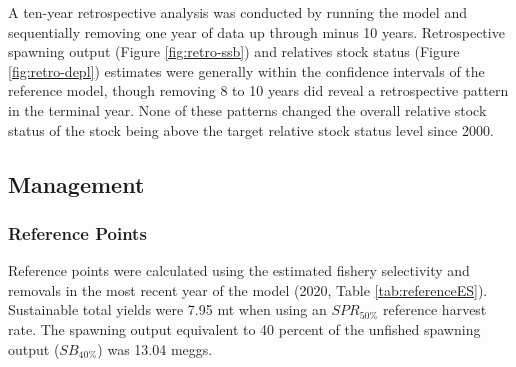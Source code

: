 \documentclass[11pt,
  english,
  a4paper,
]{article}
\begin{document}
A ten-year retrospective analysis was conducted by running the model and sequentially removing one year of data up through minus 10 years. Retrospective spawning output (Figure \ref{fig:retro-ssb}) and relatives stock status (Figure \ref{fig:retro-depl}) estimates were generally within the confidence intervals of the reference model, though removing 8 to 10 years did reveal a retrospective pattern in the terminal year. None of these patterns changed the overall relative stock status of the stock being above the target relative stock status level since 2000.

\leavevmode\tagmcend\tagstructend\par


\hypertarget{management}{%
\subsection{Management}\label{management}}

\leavevmode\tagmcend\tagstructend


\hypertarget{reference-points-1}{%
\subsubsection{Reference Points}\label{reference-points-1}}

\leavevmode\tagmcend\tagstructend


Reference points were calculated using the estimated fishery selectivity and removals in the most recent year of the model (2020, Table \ref{tab:referenceES}). Sustainable total yields were 7.95 mt when using an {\(SPR_{50\%}\)\leavevmode\tagmcend\tagstructend} reference harvest rate. The spawning output equivalent to 40 percent of the unfished spawning output ({\(SB_{40\%}\)\leavevmode\tagmcend\tagstructend}) was 13.04 meggs.

\leavevmode\tagmcend\tagstructend\par

\end{document}
